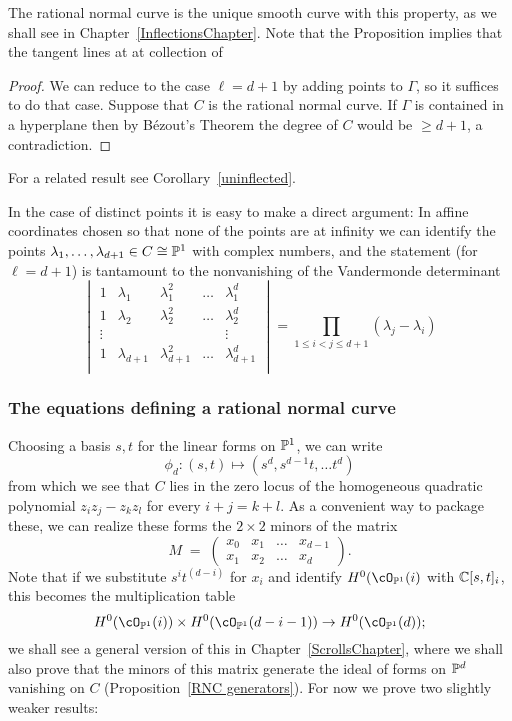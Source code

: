 The rational normal curve is the unique smooth curve with this property, as we shall see in Chapter~\ref{InflectionsChapter}. Note that the Proposition implies that the tangent lines at at collection of 

\begin{proof}
 We can reduce to the case $\ell = d+1$ by adding points to $\Gamma$, so it suffices to do that case. Suppose that $C$ is the rational normal curve.
If $\Gamma$ is contained in a hyperplane then by B\'ezout's Theorem the degree of $C$ would be $\geq d+1$, a contradiction.
\end{proof}

For a related result see Corollary~\ref{uninflected}.

In the case of distinct points it is easy to make a direct argument: In affine coordinates chosen so that none of the points are
at infinity we can identify the points $\lambda_1,\dots,\lambda_{d+1} \in C \cong \PP^1$ with complex numbers, and the statement (for $\ell = d+1$) is tantamount to the nonvanishing of the Vandermonde determinant
$$
\begin{vmatrix}
1 & \lambda_1 & \lambda_1^2 & \dots & \lambda_1^d \\
1 & \lambda_2 & \lambda_2^2 & \dots & \lambda_2^d \\
\vdots & & & & \vdots \\
1 & \lambda_{d+1} & \lambda_{d+1}^2 & \dots & \lambda_{d+1}^d \\
\end{vmatrix}
= \prod_{1 \leq i < j \leq d+1} (\lambda_j - \lambda_i)
$$

\subsubsection{The equations defining a rational normal curve}

Choosing a basis $s,t$ for the linear forms on $\PP^1$, we can write
$$
\phi_d : (s,t) \mapsto (s^d, s^{d-1}t,\dots t^d)
$$
from which we see that $C$ lies in the zero locus of the homogeneous quadratic polynomial $z_iz_j - z_kz_l$ for every $i+j=k+l$. As a convenient way to package these, we can realize these forms the $2\times 2$ minors of the matrix
$$
M \; = \; \begin{pmatrix}
x_0 & x_1 & \dots & x_{d-1} \\
x_1 & x_2 & \dots & x_d
\end{pmatrix}.
$$
Note that if we substitute $s^it^{(d-i)}$ for $x_i$ and identify $H^0(\cO_{\PP^1}(i)$ with $\CC[s,t]_i$, this becomes the multiplication table
$$
H^0(\cO_{\PP^1}(i)) \times H^0(\cO_{\PP^1}(d-i-1)) \to H^0(\cO_{\PP^1}(d));
$$
we shall see a general version of this in Chapter~\ref{ScrollsChapter}, where we shall also prove that 
the minors of this matrix generate the ideal of forms on $\PP^d$ vanishing on $C$ (Proposition~\ref{RNC generators}).
For now we prove two slightly weaker results:

